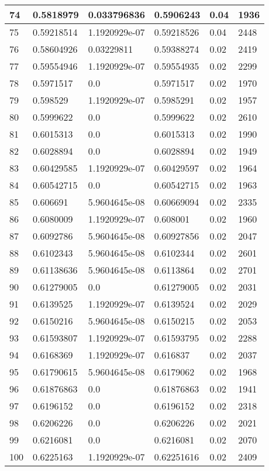 \begin{longtable}{|l|l|l|l|l|l|}
74 & 0.5818979 & 0.033796836 & 0.5906243 & 0.04 & 1936 \\ \hline 
75 & 0.59218514 & 1.1920929e-07 & 0.59218526 & 0.04 & 2448 \\ \hline 
76 & 0.58604926 & 0.03229811 & 0.59388274 & 0.02 & 2419 \\ \hline 
77 & 0.59554946 & 1.1920929e-07 & 0.59554935 & 0.02 & 2299 \\ \hline 
78 & 0.5971517 & 0.0 & 0.5971517 & 0.02 & 1970 \\ \hline 
79 & 0.598529 & 1.1920929e-07 & 0.5985291 & 0.02 & 1957 \\ \hline 
80 & 0.5999622 & 0.0 & 0.5999622 & 0.02 & 2610 \\ \hline 
81 & 0.6015313 & 0.0 & 0.6015313 & 0.02 & 1990 \\ \hline 
82 & 0.6028894 & 0.0 & 0.6028894 & 0.02 & 1949 \\ \hline 
83 & 0.60429585 & 1.1920929e-07 & 0.60429597 & 0.02 & 1964 \\ \hline 
84 & 0.60542715 & 0.0 & 0.60542715 & 0.02 & 1963 \\ \hline 
85 & 0.606691 & 5.9604645e-08 & 0.60669094 & 0.02 & 2335 \\ \hline 
86 & 0.6080009 & 1.1920929e-07 & 0.608001 & 0.02 & 1960 \\ \hline 
87 & 0.6092786 & 5.9604645e-08 & 0.60927856 & 0.02 & 2047 \\ \hline 
88 & 0.6102343 & 5.9604645e-08 & 0.6102344 & 0.02 & 2601 \\ \hline 
89 & 0.61138636 & 5.9604645e-08 & 0.6113864 & 0.02 & 2701 \\ \hline 
90 & 0.61279005 & 0.0 & 0.61279005 & 0.02 & 2031 \\ \hline 
91 & 0.6139525 & 1.1920929e-07 & 0.6139524 & 0.02 & 2029 \\ \hline 
92 & 0.6150216 & 5.9604645e-08 & 0.6150215 & 0.02 & 2053 \\ \hline 
93 & 0.61593807 & 1.1920929e-07 & 0.61593795 & 0.02 & 2288 \\ \hline 
94 & 0.6168369 & 1.1920929e-07 & 0.616837 & 0.02 & 2037 \\ \hline 
95 & 0.61790615 & 5.9604645e-08 & 0.6179062 & 0.02 & 1968 \\ \hline 
96 & 0.61876863 & 0.0 & 0.61876863 & 0.02 & 1941 \\ \hline 
97 & 0.6196152 & 0.0 & 0.6196152 & 0.02 & 2318 \\ \hline 
98 & 0.6206226 & 0.0 & 0.6206226 & 0.02 & 2021 \\ \hline 
99 & 0.6216081 & 0.0 & 0.6216081 & 0.02 & 2070 \\ \hline 
100 & 0.6225163 & 1.1920929e-07 & 0.62251616 & 0.02 & 2409 \\ \hline 
\end{longtable}